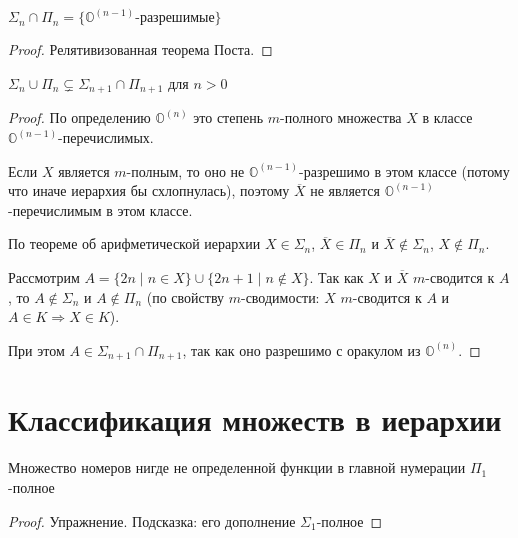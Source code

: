 \begin{cor}
	$ \Sigma_n \cap \Pi_n = \{\mathbb{O}^{(n-1)} \text{-разрешимые}\}$
\end{cor}
\begin{proof}
    Релятивизованная теорема Поста.
\end{proof}
\begin{cor}
    $ \Sigma_n \cup \Pi_n \subsetneq \Sigma_{n+1} \cap \Pi_{n+1}$ для $ n > 0$
\end{cor}
\begin{proof}
	По определению $ \mathbb{O}^{(n)}$ это степень $ m$-полного множества  $ X$ в классе  $ \mathbb{O}^{(n-1)}$-перечислимых.

	Если $ X$ является $ m$-полным, то оно не $ \mathbb{O}^{(n-1)}$-разрешимо в этом классе (потому что иначе иерархия бы схлопнулась), поэтому $ \overline{X}$ не является $ \mathbb{O}^{(n-1)}$-перечислимым в этом классе.

	По теореме об арифметической иерархии $ X \in \Sigma_n$, $ \overline{X} \in \Pi_n$ и $\overline{X} \notin \Sigma_n$, $ X \notin \Pi_n$.

	Рассмотрим $ A = \{2n \mid n \in X\} \cup \{2n+1 \mid n \notin X\}$. Так как $ X$ и $ \overline X$ $ m$-сводится к $ A$, то $ A \notin \Sigma_n$ и $ A \notin \Pi_n$ (по свойству $m$-сводимости: $ X$ $ m$-сводится к $ A$ и $ A \in K \Longrightarrow X \in K$).

	При этом $ A \in \Sigma_{n+1} \cap \Pi_{n+1}$, так как оно разрешимо с оракулом из $ \mathbb{O}^{(n)}$.
\end{proof}


\section{Классификация множеств в иерархии}
\begin{thm}
    Множество номеров нигде не определенной функции в главной нумерации $ \Pi_1$-полное
\end{thm}
\begin{proof}
    Упражнение. Подсказка: его дополнение $ \Sigma_1$-полное
\end{proof}

